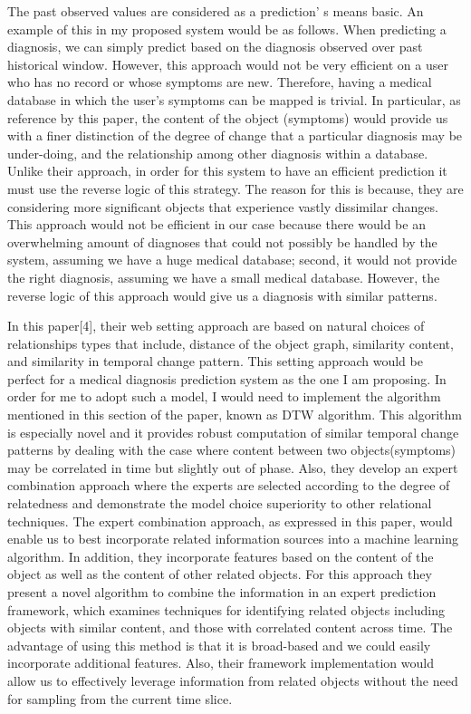 \documentclass[sts]{sig-alternate}
\begin{document}
		The past observed values are considered as a prediction' s means basic. An example of 					this in 	my proposed system would be as follows. When predicting a diagnosis, we can simply 				predict 	based on the diagnosis observed over past historical window. However, this approach 				would not be very efficient on a user who has no record or whose symptoms are new. Therefore, 			having a medical database in which the user's symptoms can be mapped is trivial. In particular, 			as reference by this paper, the content of the object (symptoms) would provide us with a finer 			distinction of the degree of change that a particular diagnosis may be under-doing, and the 				relationship among other diagnosis within a database. Unlike their approach, in order for this 			system to have an efficient prediction it must use the reverse logic of this strategy. The 				reason for this is because, they are considering more significant objects that experience vastly 		dissimilar changes. This approach would not be efficient in our case because there would be an 			overwhelming amount of diagnoses that could not possibly be handled by the system, assuming we 			have a huge medical database; second, it would not provide the right diagnosis, assuming we have 		a small medical database. However, the reverse logic of this approach would give us a diagnosis 			with similar patterns.\newline

		In this paper[4], their web setting approach are based on natural choices of relationships types 		that include, distance of the object graph, similarity content, and similarity in temporal 				change pattern. This setting approach would be perfect for a medical diagnosis prediction system 		as the one I am proposing. In order for me to adopt such a model, I would need to implement the 			algorithm mentioned in this section of the paper, known as DTW algorithm. This algorithm is 				especially novel and it provides robust computation of similar temporal change patterns by 				dealing with the case where content between two objects(symptoms) may be correlated in time but 			slightly out of phase. Also, they develop an expert combination approach where the experts are 			selected according to the degree of relatedness and demonstrate the model choice superiority to 			other relational techniques. The expert combination approach, as expressed in this paper, would 			enable us to best incorporate related information sources into a machine learning algorithm. In 			addition, they incorporate features based on the content of the object as well as the content 			of other related objects. For this approach they present a novel algorithm to combine the 				information in an expert prediction 	framework, which examines techniques for identifying 				related objects including objects with similar content, and those with correlated content across 		time. The advantage of using this method is that it is broad-based and we could easily 					incorporate additional features. Also, their framework implementation would allow us to 					effectively  leverage information from related objects without the 	need for sampling from the 		current time slice.\newline
	
\end{document}
